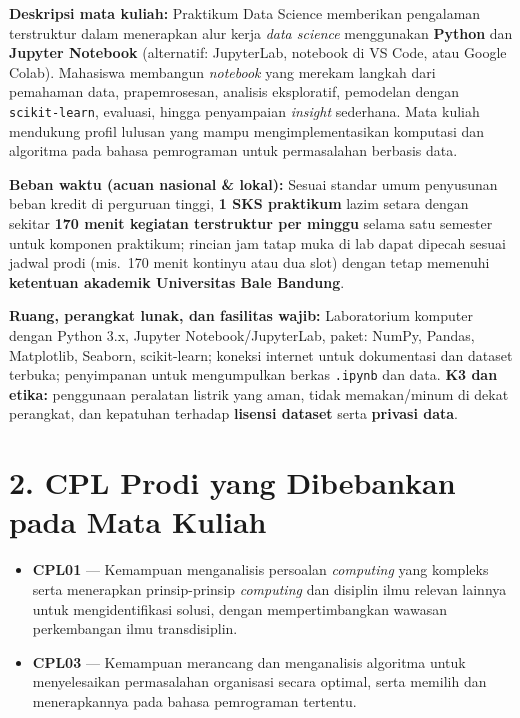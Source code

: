 \documentclass[12pt,a4paper]{article}
\begin{document}
\vspace{0.35cm}

\noindent\textbf{Deskripsi mata kuliah:} Praktikum Data Science memberikan pengalaman terstruktur dalam menerapkan alur kerja \textit{data science} menggunakan \textbf{Python} dan \textbf{Jupyter Notebook} (alternatif: JupyterLab, notebook di VS Code, atau Google Colab). Mahasiswa membangun \textit{notebook} yang merekam langkah dari pemahaman data, prapemrosesan, analisis eksploratif, pemodelan dengan \texttt{scikit-learn}, evaluasi, hingga penyampaian \textit{insight} sederhana. Mata kuliah mendukung profil lulusan yang mampu mengimplementasikan komputasi dan algoritma pada bahasa pemrograman untuk permasalahan berbasis data.

\vspace{0.35cm}

\noindent\textbf{Beban waktu (acuan nasional \& lokal):} Sesuai standar umum penyusunan beban kredit di perguruan tinggi, \textbf{1 SKS praktikum} lazim setara dengan sekitar \textbf{170 menit kegiatan terstruktur per minggu} selama satu semester untuk komponen praktikum; rincian jam tatap muka di lab dapat dipecah sesuai jadwal prodi (mis.\ 170 menit kontinyu atau dua slot) dengan tetap memenuhi \textbf{ketentuan akademik Universitas Bale Bandung}.

\vspace{0.35cm}

\noindent\textbf{Ruang, perangkat lunak, dan fasilitas wajib:} Laboratorium komputer dengan Python 3.x, Jupyter Notebook/JupyterLab, paket: NumPy, Pandas, Matplotlib, Seaborn, scikit-learn; koneksi internet untuk dokumentasi dan dataset terbuka; penyimpanan untuk mengumpulkan berkas \texttt{.ipynb} dan data. \textbf{K3 dan etika:} penggunaan peralatan listrik yang aman, tidak memakan/minum di dekat perangkat, dan kepatuhan terhadap \textbf{lisensi dataset} serta \textbf{privasi data}.

\vspace{0.5cm}

\section*{2. CPL Prodi yang Dibebankan pada Mata Kuliah}

\begin{itemize}[leftmargin=*]
  \item \textbf{CPL01} --- Kemampuan menganalisis persoalan \textit{computing} yang kompleks serta menerapkan prinsip-prinsip \textit{computing} dan disiplin ilmu relevan lainnya untuk mengidentifikasi solusi, dengan mempertimbangkan wawasan perkembangan ilmu transdisiplin.

  \item \textbf{CPL03} --- Kemampuan merancang dan menganalisis algoritma untuk menyelesaikan permasalahan organisasi secara optimal, serta memilih dan menerapkannya pada bahasa pemrograman tertentu.
\end{itemize}
\end{document}
